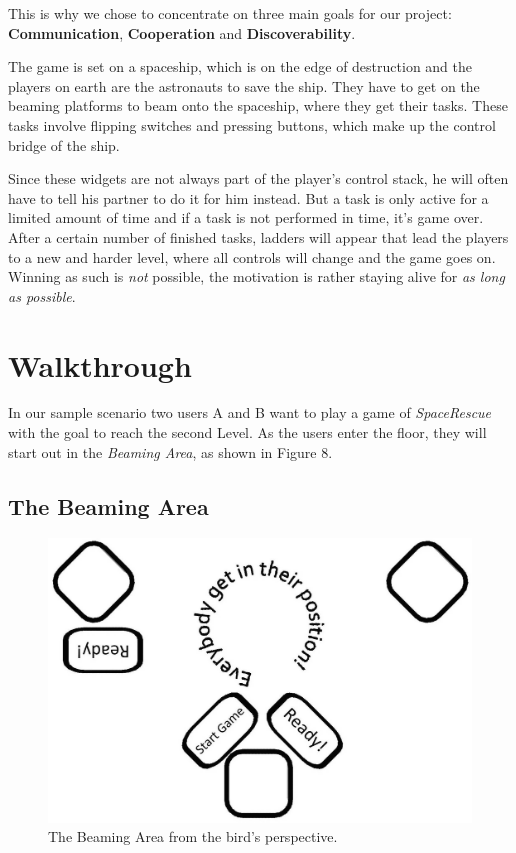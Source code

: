 \documentclass{sigchi}
\begin{document}
This is why we chose to concentrate on three main goals for our project: \textbf{Communication}, \textbf{Cooperation} and \textbf{Discoverability}.



\pagebreak

The game is set on a spaceship, which is on the edge of destruction and the players on earth are the astronauts to save the ship. They have to get on the beaming platforms to beam onto the spaceship, where they get their tasks. These tasks involve flipping switches and pressing buttons, which make up the control bridge of the ship. 

Since these widgets are not always part of the player's control stack, he will often have to tell his partner to do it for him instead. But a task is only active for a limited amount of time and if a task is not performed in time, it's game over. \newline
After a certain number of finished tasks, ladders will appear that lead the players to a new and harder level, where all controls will change and the game goes on. Winning as such is \textit{not} possible, the motivation is rather staying alive for  \textit{as long as possible}.
\section{Walkthrough}
\vspace{1mm}
In our sample scenario two users A and B want to play a game of \textit{SpaceRescue} with the goal to reach the second Level. As the users enter the floor, they will start out in the \textit{Beaming Area}, as shown in Figure 8.

\subsection{The Beaming Area}
\vspace{3mm}

\begin{figure}[h]
\centering
\includegraphics[width=0.8\columnwidth]{beamingArea}
\caption{The Beaming Area from the bird's perspective.}
\label{fig:beamingArea}
\end{figure}
\end{document}

